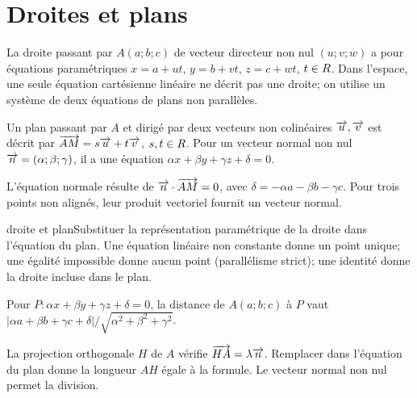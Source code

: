 \section{Droites et plans}
\begin{definition}La droite passant par $A(a;b;c)$ de vecteur directeur non nul $(u;v;w)$ a pour équations paramétriques $x=a+ut$, $y=b+vt$, $z=c+wt$, $t\in R$. Dans l’espace, une seule équation cartésienne linéaire ne décrit pas une droite; on utilise un système de deux équations de plans non parallèles.\end{definition}
\begin{definition}Un plan passant par $A$ et dirigé par deux vecteurs non colinéaires $\overrightarrow{u},\overrightarrow{v}$ est décrit par $\overrightarrow{AM}=s\overrightarrow{u}+t\overrightarrow{v}$, $s,t\in R$. Pour un vecteur normal non nul $\overrightarrow{n}=(\alpha;\beta;\gamma)$, il a une équation $\alpha x+\beta y+\gamma z+\delta=0$.\end{definition}
\begin{demonstration}L’équation normale résulte de $\overrightarrow{n}\cdot\overrightarrow{AM}=0$, avec $\delta=-\alpha a-\beta b-\gamma c$. Pour trois points non alignés, leur produit vectoriel fournit un vecteur normal.\end{demonstration}
\begin{methode}{droite et plan}Substituer la représentation paramétrique de la droite dans l’équation du plan. Une équation linéaire non constante donne un point unique; une égalité impossible donne aucun point (parallélisme strict); une identité donne la droite incluse dans le plan.\end{methode}
\begin{propriete}Pour $P:\alpha x+\beta y+\gamma z+\delta=0$, la distance de $A(a;b;c)$ à $P$ vaut $|\alpha a+\beta b+\gamma c+\delta|/\sqrt{\alpha^2+\beta^2+\gamma^2}$.\end{propriete}
\begin{demonstration}La projection orthogonale $H$ de $A$ vérifie $\overrightarrow{HA}=\lambda\overrightarrow{n}$. Remplacer dans l’équation du plan donne la longueur $AH$ égale à la formule. Le vecteur normal non nul permet la division.\end{demonstration}


